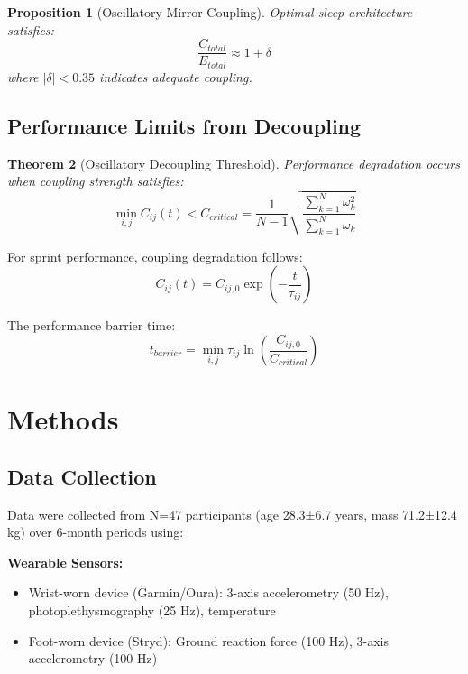 \documentclass[12pt,twocolumn]{article}
\newtheorem{theorem}{Theorem}
\newtheorem{proposition}[theorem]{Proposition}
\begin{document}
\begin{proposition}[Oscillatory Mirror Coupling]
Optimal sleep architecture satisfies:
\begin{equation}
\frac{C_{total}}{E_{total}} \approx 1 + \delta
\end{equation}
where $|\delta| < 0.35$ indicates adequate coupling.
\end{proposition}

\subsection{Performance Limits from Decoupling}

\begin{theorem}[Oscillatory Decoupling Threshold]
Performance degradation occurs when coupling strength satisfies:
\begin{equation}
\min_{i,j} C_{ij}(t) < C_{critical} = \frac{1}{N-1}\sqrt{\frac{\sum_{k=1}^{N} \omega_k^2}{\sum_{k=1}^{N} \omega_k}}
\end{equation}
\end{theorem}

For sprint performance, coupling degradation follows:
\begin{equation}
C_{ij}(t) = C_{ij,0} \exp\left(-\frac{t}{\tau_{ij}}\right)
\end{equation}

The performance barrier time:
\begin{equation}
t_{barrier} = \min_{i,j} \tau_{ij} \ln\left(\frac{C_{ij,0}}{C_{critical}}\right)
\end{equation}

\section{Methods}

\subsection{Data Collection}

Data were collected from N=47 participants (age 28.3±6.7 years, mass 71.2±12.4 kg) over 6-month periods using:

\textbf{Wearable Sensors:}
\begin{itemize}
\item Wrist-worn device (Garmin/Oura): 3-axis accelerometry (50 Hz), photoplethysmography (25 Hz), temperature
\item Foot-worn device (Stryd): Ground reaction force (100 Hz), 3-axis accelerometry (100 Hz)
\end{itemize}
\end{document}
